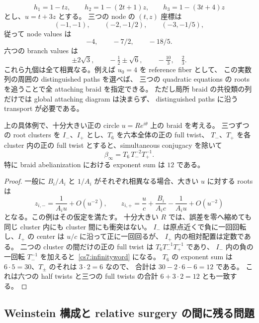 \begin{example}
\label{cs7:explicitmodel}
\[
 h_1=1-tz,\qquad h_2=1-(2t+1)z,\qquad
 h_3=1-(3t+4)z
\]
とし、$u=t+3z$ とする。
三つの node の $(t,z)$ 座標は
\[
 (-1,-1),\qquad(-2,-1/2),\qquad(-3,-1/5),
\]
従って node values は
\[
 -4,\qquad-7/2,\qquad-18/5.
\]
六つの branch values は
\[
 \pm2\sqrt3,\qquad-\tfrac12\pm\sqrt6,\qquad
 -\tfrac{10}{3},\quad\tfrac23.
\]
これら九個は全て相異なる。例えば $u_0=4$ を reference fiber として、
この実数列の周囲の distinguished paths を選べば、
三つの quadratic equations の roots を追うことで全 attaching braid を指定できる。
ただし局所 braid の共役類の列だけでは global attaching diagram は決まらず、
distinguished paths に沿う transport が必要である。
\end{example}

\begin{proposition}
\label{cs7:infinitybraid}
上の具体例で、十分大きい正の circle $u=Re^{i\theta}$ 上の braid を考える。
三つずつの root clusters を $I_-$、$I_+$ とし、$T_6$ を六本全体の正の full twist、
$T_-$、$T_+$ を各 cluster 内の正の full twist とすると、simultaneous conjugacy を除いて
\begin{equation}
 \beta_\infty=T_6\,T_-^{-2}T_+^{-1}.
 \label{cs7:infinityword}
\end{equation}
特に braid abelianization における exponent sum は $12$ である。
\end{proposition}

\begin{proof}
一般に $B_i/A_i$ と $1/A_i$ がそれぞれ相異なる場合、大きい $u$ に対する roots は
\[
 z_{i,-}=\frac1{A_i u}+O(u^{-2}),\qquad
 z_{i,+}=\frac u c+\frac{B_i}{A_i c}-\frac1{A_i u}+O(u^{-2})
\]
となる。この例はその仮定を満たす。
十分大きい $R$ では、誤差を零へ縮めても同じ cluster 内にも cluster 間にも衝突はない。
$I_-$ は原点近くで負に一回回転し、$I_+$ の center は $u/c$ に沿って正に一回回るが、
$I_+$ 内の相対配置は定数である。
二つの cluster の間だけの正の full twist は $T_6T_-^{-1}T_+^{-1}$ であり、
$I_-$ 内の負の一回転 $T_-^{-1}$ を加えると~\eqref{cs7:infinityword} になる。
$T_6$ の exponent sum は $6\cdot5=30$、$T_\pm$ のそれは $3\cdot2=6$ なので、
合計は $30-2\cdot6-6=12$ である。
これは六つの half twists と三つの full twists の合計 $6+3\cdot2=12$ とも一致する。
\end{proof}

\subsection{Weinstein 構成と relative surgery の間に残る問題}

